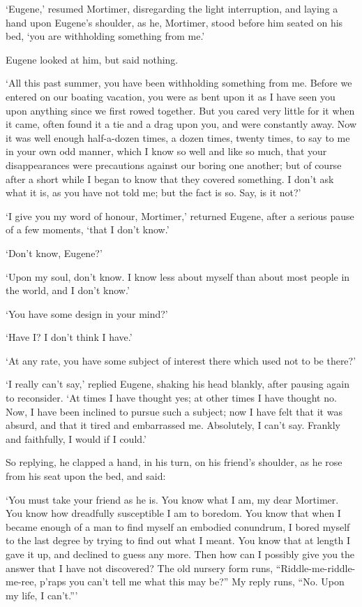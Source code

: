 ‘Eugene,’ resumed Mortimer, disregarding the light interruption, and
laying a hand upon Eugene’s shoulder, as he, Mortimer, stood before him
seated on his bed, ‘you are withholding something from me.’

Eugene looked at him, but said nothing.

‘All this past summer, you have been withholding something from me.
Before we entered on our boating vacation, you were as bent upon it as I
have seen you upon anything since we first rowed together. But you cared
very little for it when it came, often found it a tie and a drag upon
you, and were constantly away. Now it was well enough half-a-dozen
times, a dozen times, twenty times, to say to me in your own odd manner,
which I know so well and like so much, that your disappearances were
precautions against our boring one another; but of course after a short
while I began to know that they covered something. I don’t ask what it
is, as you have not told me; but the fact is so. Say, is it not?’

‘I give you my word of honour, Mortimer,’ returned Eugene, after a
serious pause of a few moments, ‘that I don’t know.’

‘Don’t know, Eugene?’

‘Upon my soul, don’t know. I know less about myself than about most
people in the world, and I don’t know.’

‘You have some design in your mind?’

‘Have I? I don’t think I have.’

‘At any rate, you have some subject of interest there which used not to
be there?’

‘I really can’t say,’ replied Eugene, shaking his head blankly, after
pausing again to reconsider. ‘At times I have thought yes; at other
times I have thought no. Now, I have been inclined to pursue such a
subject; now I have felt that it was absurd, and that it tired and
embarrassed me. Absolutely, I can’t say. Frankly and faithfully, I would
if I could.’

So replying, he clapped a hand, in his turn, on his friend’s shoulder,
as he rose from his seat upon the bed, and said:

‘You must take your friend as he is. You know what I am, my dear
Mortimer. You know how dreadfully susceptible I am to boredom. You know
that when I became enough of a man to find myself an embodied conundrum,
I bored myself to the last degree by trying to find out what I meant.
You know that at length I gave it up, and declined to guess any more.
Then how can I possibly give you the answer that I have not discovered?
The old nursery form runs, “Riddle-me-riddle-me-ree, p’raps you can’t
tell me what this may be?” My reply runs, “No. Upon my life, I can’t.”’

